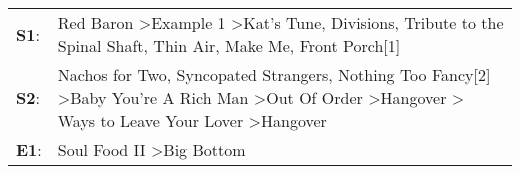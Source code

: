 \begin{supertabular}{p{0.03\textwidth}p{0.92\textwidth}}
 \textbf{S1}:  &                                                                            Red Baron\textsuperscript{} \textgreater \enspace Example 1\textsuperscript{} \textgreater \enspace Kat's Tune\textsuperscript{}, \enspace Divisions\textsuperscript{}, \enspace Tribute to the Spinal Shaft\textsuperscript{}, \enspace Thin Air\textsuperscript{}, \enspace Make Me\textsuperscript{}, \enspace Front Porch[1]\textsuperscript{}  \enspace  \\
 \textbf{S2}:  &  Nachos for Two\textsuperscript{}, \enspace Syncopated Strangers\textsuperscript{}, \enspace Nothing Too Fancy[2]\textsuperscript{} \textgreater \enspace Baby You're A Rich Man\textsuperscript{} \textgreater \enspace Out Of Order\textsuperscript{} \textgreater \enspace Hangover\textsuperscript{} \textgreater {} Ways to Leave Your Lover\textsuperscript{} \textgreater \enspace Hangover\textsuperscript{}  \enspace  \\
 \textbf{E1}:  &                                                                                                                                                                                                                                                                                                                                             Soul Food II\textsuperscript{} \textgreater \enspace Big Bottom\textsuperscript{}  \enspace  \\
\end{supertabular}
